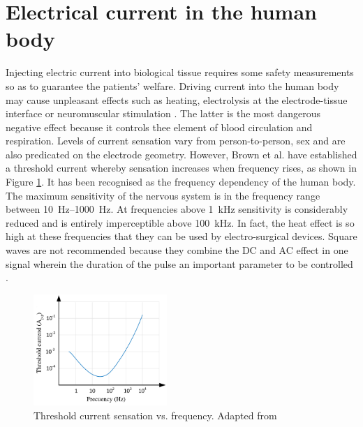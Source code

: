 \section{Electrical current in the human body} %
\label{section impedance current in body}
Injecting electric current into biological tissue requires some safety measurements so as to guarantee the patients' welfare. Driving current into the human body may cause unpleasant effects such as heating, electrolysis at the electrode-tissue interface or neuromuscular stimulation \cite{martinsen2011bioimpedance, bertemes2002tissue}. The latter is the most dangerous negative effect because it controls thee element of blood circulation and respiration. Levels of current sensation vary from person-to-person, sex and are also predicated on the electrode geometry. However, Brown et al. \cite{brown1998medical} have established a threshold current whereby sensation increases when frequency rises, as shown in Figure \ref{fig:threshold sensation}. It has been recognised as the frequency dependency of the human body. The maximum sensitivity of the nervous system is in the frequency range between \SIrange[scientific-notation = engineering]{10}{1000}{\hertz}. At frequencies above \SI{1}{\kilo\hertz} sensitivity is considerably reduced and is entirely imperceptible above \SI{100}{\kilo\hertz}. In fact, the heat effect is so high at these frequencies that they can be used by electro-surgical devices. Square waves are not recommended because they combine the DC and AC effect in one signal wherein the duration of the pulse an important parameter to be controlled \cite{martinsen2011bioimpedance}.

\begin{figure}[!htpb]
	\centering
	\includegraphics[width=0.45\textwidth,keepaspectratio]{figure14}    
	\caption[Threshold current sensation vs. frequency]{Threshold current sensation vs. frequency. Adapted from \cite{brown1998medical}}
	\label{fig:threshold sensation}
\end{figure}

